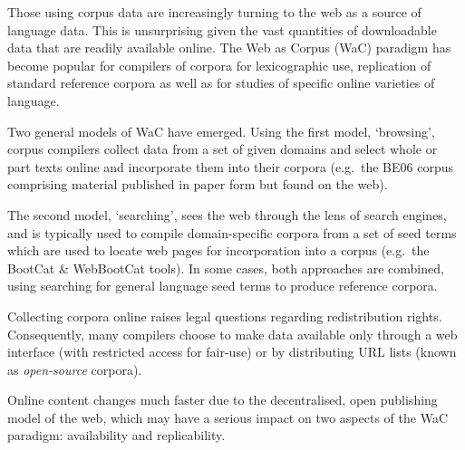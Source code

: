 
Those using corpus data are increasingly turning to the web as a source of language data. This is unsurprising given the vast quantities of downloadable data that are readily available online. The Web as Corpus (WaC) paradigm\cite{kilgarriff2003introduction} has become popular for compilers of corpora for lexicographic use, replication of standard reference corpora as well as for studies of specific online varieties of language. 

Two general models of WaC have emerged. Using the first model, `browsing', corpus compilers collect data from a set of given domains and select whole or part texts online and incorporate them into their corpora (e.g.\ the BE06\cite{baker2009be06} corpus comprising material published in paper form but found on the web).

The second model, `searching', sees the web through the lens of search engines, and is typically used to compile domain-specific corpora from a set of seed terms which are used to locate web pages for incorporation into a corpus (e.g.\ the BootCat \& WebBootCat tools\cite{baroni2004bootcat}). %
In some cases, both approaches are combined, using searching for general language seed terms to produce reference corpora\cite{kilgarriff2010corpus}.

Collecting corpora online raises legal questions regarding redistribution rights.  Consequently, many compilers choose to make data available only through a web interface (with restricted access for fair-use) or by distributing URL lists (known as \textsl{open-source} corpora\cite{sharoff2006open}).



Online content changes much faster due to the decentralised, open publishing model of the web, which may have a serious impact on two aspects of the WaC paradigm: availability and replicability.

